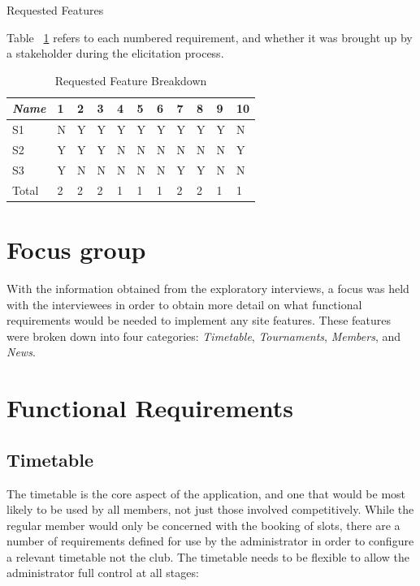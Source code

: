 \begin{table}[H]
\label{fig:requirementsFeatures}
\caption{Requested Features}
\end{table}
Table ~\ref{fig:reqbreakdown} refers to each numbered requirement, and whether it was brought up by a stakeholder during the elicitation process.
\begin{table}[H]
\caption{Requested Feature Breakdown}
\begin{center}
    \begin{tabular}{ | l | l | l | l| l| l| l| l| l|l| p{.22cm} |}
    \hline
     \textit{Name}& 1& 2 & 3 & 4 & 5 & 6 & 7 & 8 & 9 & 10\\ \hline
	 S1 & N & Y & Y & Y & Y & Y & Y & Y & Y & N\\ \hline
	 S2 & Y & Y & Y & N & N & N & N & N & N & Y\\ \hline
	 S3 & Y & N & N & N & N & N & Y & Y & N & N\\ \hline
  Total & 2 & 2 & 2 & 1 & 1 & 1 & 2 & 2 & 1 & 1\\ \hline
    \end{tabular}
\end{center}
\label{fig:reqbreakdown}
\end{table}

\section{Focus group}

With the information obtained from the exploratory interviews, a focus was held with the interviewees in order to obtain more detail on what functional requirements would be needed to implement any site features. These features were broken down into four categories: \textit{Timetable}, \textit{Tournaments}, \textit{Members}, and \textit{News}.

\section{Functional Requirements}

\subsection{Timetable} 

The timetable is the core aspect of the application, and one that would be most likely to be used by all members, not just those involved competitively. While the regular member would only be concerned with the booking of slots, there are a number of requirements defined for use by the administrator in order to configure a relevant timetable not the club. The timetable needs to be flexible to allow the administrator full control at all stages:

